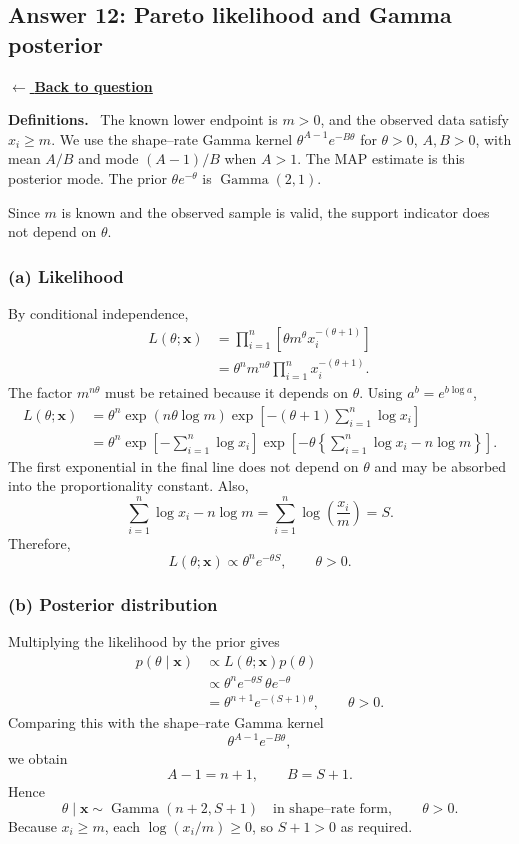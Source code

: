 \documentclass[11pt,a4paper]{article}
\newcommand{\given}{\mathrel{|}}
\newcommand{\xvec}{\boldsymbol{x}}
\newcommand{\answernav}[1]{%
  \label{answer:#1}%
  \noindent\hyperref[question:#1]{$\leftarrow$ \textbf{Back to question}}%
  \par\smallskip}
\newcommand{\studyheading}[1]{%
  \par\medskip\noindent\textcolor{statblue}{\textbf{#1.}}\ }
\begin{document}
\subsection{Answer 12: Pareto likelihood and Gamma posterior}
\answernav{12}

\studyheading{Definitions}
The known lower endpoint is $m>0$, and the observed data satisfy $x_i\ge m$.
We use the shape--rate Gamma kernel
$\theta^{A-1}e^{-B\theta}$ for $\theta>0$, $A,B>0$, with mean $A/B$ and mode $(A-1)/B$ when $A>1$.
The MAP estimate is this posterior mode.
The prior $\theta e^{-\theta}$ is $\operatorname{Gamma}(2,1)$.

Since $m$ is known and the observed sample is valid, the support indicator does not depend on $\theta$.

\subsubsection*{(a) Likelihood}

By conditional independence,
\begin{align*}
L(\theta;\xvec)
&=\prod_{i=1}^n
  \left[\theta m^\theta x_i^{-(\theta+1)}\right]\\
&=\theta^n m^{n\theta}
  \prod_{i=1}^n x_i^{-(\theta+1)}.
\end{align*}
The factor $m^{n\theta}$ must be retained because it depends on $\theta$.
Using $a^b=e^{b\log a}$,
\begin{align*}
L(\theta;\xvec)
&=\theta^n
  \exp\left(n\theta\log m\right)
  \exp\left[-(\theta+1)\sum_{i=1}^n\log x_i\right]\\
&=\theta^n
  \exp\left[-\sum_{i=1}^n\log x_i\right]
  \exp\left[-\theta\left\{
    \sum_{i=1}^n\log x_i-n\log m
  \right\}\right].
\end{align*}
The first exponential in the final line does not depend on $\theta$ and may
be absorbed into the proportionality constant. Also,
\[
\sum_{i=1}^n\log x_i-n\log m
=\sum_{i=1}^n\log\left(\frac{x_i}{m}\right)
=S.
\]
Therefore,
\[
\boxed{
L(\theta;\xvec)\propto\theta^n e^{-\theta S},
\qquad \theta>0.
}
\]

\subsubsection*{(b) Posterior distribution}

Multiplying the likelihood by the prior gives
\begin{align*}
p(\theta\given\xvec)
&\propto L(\theta;\xvec)p(\theta)\\
&\propto
\theta^n e^{-\theta S}\,
\theta e^{-\theta}\\
&=\theta^{n+1}e^{-(S+1)\theta},
\qquad \theta>0.
\end{align*}
Comparing this with the shape--rate Gamma kernel
\[
\theta^{A-1}e^{-B\theta},
\]
we obtain
\[
A-1=n+1,
\qquad
B=S+1.
\]
Hence
\[
\boxed{
\theta\given\xvec
\sim\operatorname{Gamma}(n+2,S+1)
\quad\text{in shape--rate form},
\qquad \theta>0.
}
\]
Because $x_i\geq m$, each $\log(x_i/m)\geq0$, so $S+1>0$ as required.
\end{document}
